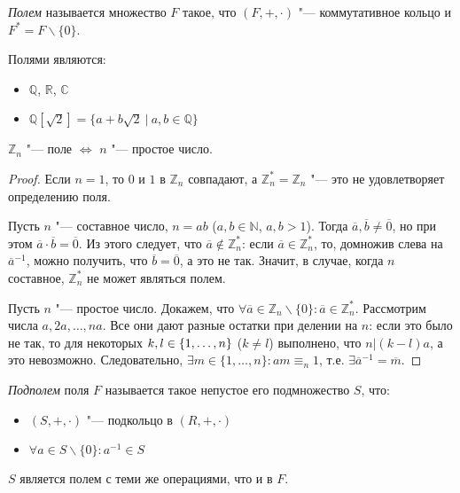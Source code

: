 \begin{definition}
	\textit{Полем} называется множество $F$ такое, что $(F, +, \cdot)$ "--- коммутативное кольцо и $F^* = F\backslash\{0\}$.
\end{definition}

\begin{example}
	Полями являются:
	\begin{itemize}
		\item $\mathbb{Q}$, $\mathbb{R}$, $\mathbb{C}$
		\item $\mathbb{Q}[\sqrt{2}] = \{a + b\sqrt{2}~|~a, b \in \mathbb{Q}\}$
	\end{itemize}
\end{example}

\begin{proposition}
	$\mathbb{Z}_n$ "--- поле $\Leftrightarrow$ $n$ "--- простое число.
\end{proposition}

\begin{proof}
	Если $n = 1$, то $0$ и $1$ в $\mathbb{Z}_n$ совпадают, а $\mathbb{Z}_n^* = \mathbb{Z}_n$ "--- это не удовлетворяет определению поля.
	
	Пусть $n$ "--- составное число, $n = ab$ ($a, b \in \mathbb{N}$, $a, b > 1$). Тогда $\overline{a}, \overline{b} \ne \overline{0}$, но при этом $\overline{a}\cdot\overline{b} = \overline{0}$. Из этого следует, что $\overline{a} \not\in \mathbb{Z}_n^*$: если $\overline{a} \in \mathbb{Z}_n^*$, то, домножив слева на $\overline{a}^{-1}$, можно получить, что $\overline{b} = \overline{0}$, а это не так. Значит, в случае, когда $n$ составное, $\mathbb{Z}_n^*$ не может являться полем.
	
	Пусть $n$ "--- простое число. Докажем, что $\forall \overline{a} \in \mathbb{Z}_n \backslash \{0\}: \overline{a} \in \mathbb{Z}_n^*$. Рассмотрим числа $a, 2a, \dots, na$. Все они дают разные остатки при делении на $n$: если это было не так, то для некоторых $k, l \hm{\in} \{1, \dots, n\}$ ($k \ne l$) выполнено, что $n|(k-l)a$, а это невозможно. Следовательно, $\exists m \in \{1, \dots, n\}: am \equiv_n 1$, т.\:е. $\exists \overline{a}^{-1} = \overline{m}$.
\end{proof}

\begin{definition}
	\textit{Подполем} поля $F$ называется такое непустое его подмножество $S$, что:
	\begin{itemize}
		\item $(S, +, \cdot)$ "--- подкольцо в $(R, +, \cdot)$
		\item $\forall a \in S\backslash\{0\}: a^{-1} \in S$
	\end{itemize}
	
	$S$ является полем с теми же операциями, что и в $F$.
\end{definition}

